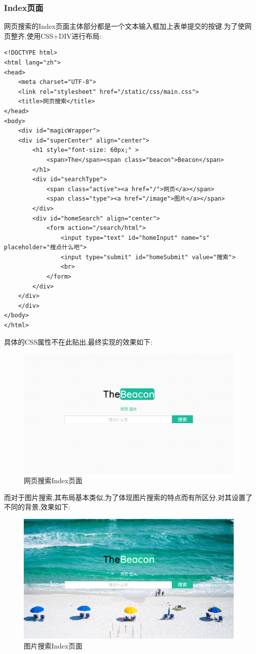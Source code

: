 \documentclass[a4paper]{article}
\begin{document}
            \subsubsection{Index页面}
网页搜索的Index页面主体部分都是一个文本输入框加上表单提交的按键.为了使网页整齐,使用CSS+DIV进行布局:
\begin{verbatim}
<!DOCTYPE html>
<html lang="zh">
<head>
    <meta charset="UTF-8">
    <link rel="stylesheet" href="/static/css/main.css">
    <title>网页搜索</title>
</head>
<body>
    <div id="magicWrapper">
    <div id="superCenter" align="center">
        <h1 style="font-size: 60px;" >
            <span>The</span><span class="beacon">Beacon</span>
        </h1>
        <div id="searchType">
            <span class="active"><a href="/">网页</a></span>
            <span class="type"><a href="/image">图片</a></span>
        </div>
        <div id="homeSearch" align="center">
            <form action="/search/html">
                <input type="text" id="homeInput" name="s" placeholder="搜点什么吧">
                <input type="submit" id="homeSubmit" value="搜索">
                <br>
            </form>
        </div>
    </div>
    </div>
</body>
</html>
\end{verbatim}

具体的CSS属性不在此贴出,最终实现的效果如下:
\begin{figure}[H]
\centering
\includegraphics[width=\textwidth]{img/index.png}
\caption{网页搜索Index页面}
\end{figure}

而对于图片搜索,其布局基本类似,为了体现图片搜索的特点而有所区分,对其设置了不同的背景,效果如下:
\begin{figure}[H]
\centering
\includegraphics[width=\textwidth]{img/index_image.jpg}
\caption{图片搜索Index页面}
\end{figure}
\end{document}
